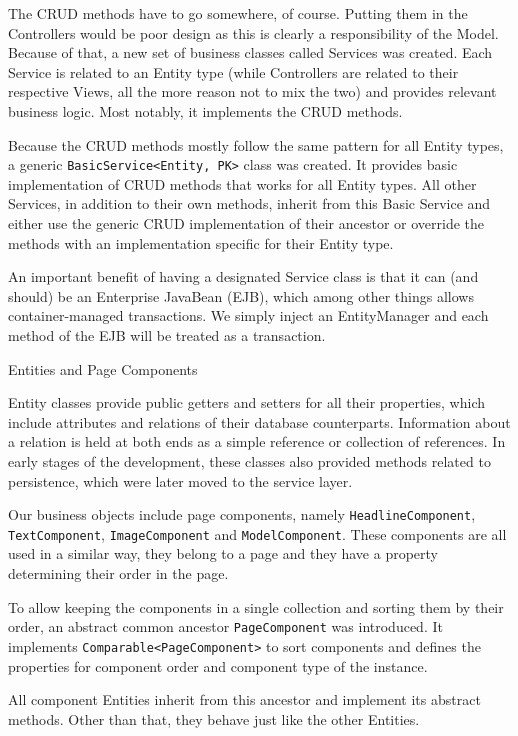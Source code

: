 The CRUD methods have to go somewhere, of course. Putting them in the Controllers would be poor design as this is clearly a responsibility of the Model. Because of that, a new set of business classes called Services was created. Each Service is related to an Entity type (while Controllers are related to their respective Views, all the more reason not to mix the two) and provides relevant business logic. Most notably, it implements the CRUD methods.

Because the CRUD methods mostly follow the same pattern for all Entity types, a generic {\tt BasicService<Entity, PK>} class was created. It provides basic implementation of CRUD methods that works for all Entity types. All other Services, in addition to their own methods, inherit from this Basic Service and either use the generic CRUD implementation of their ancestor or override the methods with an implementation specific for their Entity type.

An important benefit of having a designated Service class is that it can (and should) be an Enterprise JavaBean (EJB), which among other things allows container-managed transactions. We simply inject an EntityManager and each method of the EJB will be treated as a transaction.

\secc Entities and Page Components

Entity classes provide public getters and setters for all their properties, which include attributes and relations of their database counterparts. Information about a relation is held at both ends as a simple reference or collection of references. In early stages of the development, these classes also provided methods related to persistence, which were later moved to the service layer.

Our business objects include page components, namely {\tt HeadlineComponent}, {\tt TextComponent}, {\tt ImageComponent} and {\tt ModelComponent}. These components are all used in a similar way, they belong to a page and they have a property determining their order in the page.

To allow keeping the components in a single collection and sorting them by their order, an abstract common ancestor {\tt PageComponent} was introduced. It implements {\tt Comparable<PageComponent>} to sort components and defines the properties for component order and component type of the instance.

All component Entities inherit from this ancestor and implement its abstract methods. Other than that, they behave just like the other Entities.

